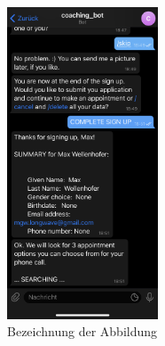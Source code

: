 \begin{figure}
	\centering
	\includegraphics[width=0.4\textwidth]{images/coaching_bot_dummy_screenshot.jpeg}
	\caption{Bezeichnung der Abbildung}
	\label{fig: Abbildung 10}
\end{figure}

